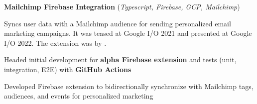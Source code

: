 \begin{cventries}
  \cvcustombodydescription
      {\textbf{Mailchimp Firebase Integration} (\emph{Typescript, Firebase, GCP, Mailchimp})}
      {
      \begin{cvtightprose} %
        {Syncs user data with a Mailchimp audience for sending personalized email marketing campaigns. It was teased at Google I/O 2021 and presented at Google I/O 2022. The extension was  by .}
      \end{cvtightprose}
      }
      {
      \begin{cvitems} %
        \item {Headed initial development for \textbf{alpha Firebase extension} and tests (unit, integration, E2E) with \textbf{GitHub Actions}}
        \item {Developed Firebase extension to bidirectionally synchronize with Mailchimp tags, audiences, and events for personalized marketing}
      \end{cvitems}
    }

\end{cventries}
